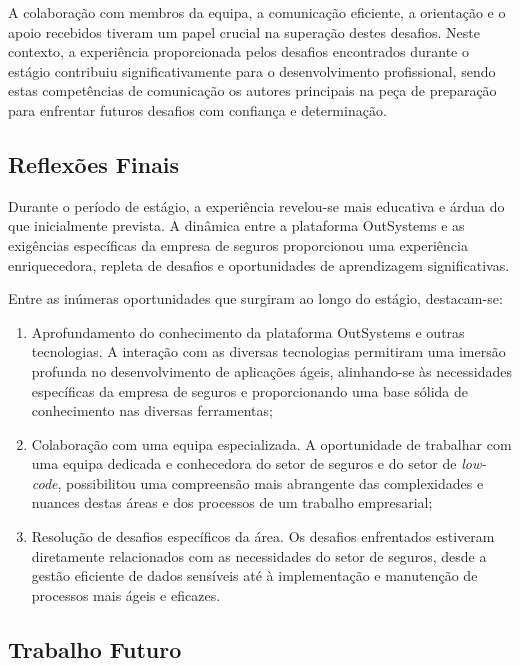         A colaboração com membros da equipa, a comunicação eficiente, a orientação e o apoio recebidos tiveram um papel crucial na superação destes desafios. Neste contexto, a experiência proporcionada pelos desafios encontrados durante o estágio contribuiu significativamente para o desenvolvimento profissional, sendo estas competências de comunicação os autores principais na peça de preparação para enfrentar futuros desafios com confiança e determinação. 

    \subsection{Reflexões Finais}\label{sub:conclusoes}

        Durante o período de estágio, a experiência revelou-se mais educativa e árdua do que inicialmente prevista. A dinâmica entre a plataforma OutSystems e as exigências específicas da empresa de seguros proporcionou uma experiência enriquecedora, repleta de desafios e oportunidades de aprendizagem significativas.

        Entre as inúmeras oportunidades que surgiram ao longo do estágio, destacam-se:
        \begin{enumerate}
            \item Aprofundamento do conhecimento da plataforma OutSystems e outras tecnologias. A interação com as diversas tecnologias permitiram uma imersão profunda no desenvolvimento de aplicações ágeis, alinhando-se às necessidades específicas da empresa de seguros e proporcionando uma base sólida de conhecimento nas diversas ferramentas;
            \item Colaboração com uma equipa especializada. A oportunidade de trabalhar com uma equipa dedicada e conhecedora do setor de seguros e do setor de \textit{low-code}, possibilitou uma compreensão mais abrangente das complexidades e nuances destas áreas e dos processos de um trabalho empresarial;
            \item Resolução de desafios específicos da área. Os desafios enfrentados estiveram diretamente relacionados com as necessidades do setor de seguros, desde a gestão eficiente de dados sensíveis até à implementação e manutenção de processos mais ágeis e eficazes.
        \end{enumerate}

    \subsection{Trabalho Futuro}\label{sub:trabalho_futuro}

